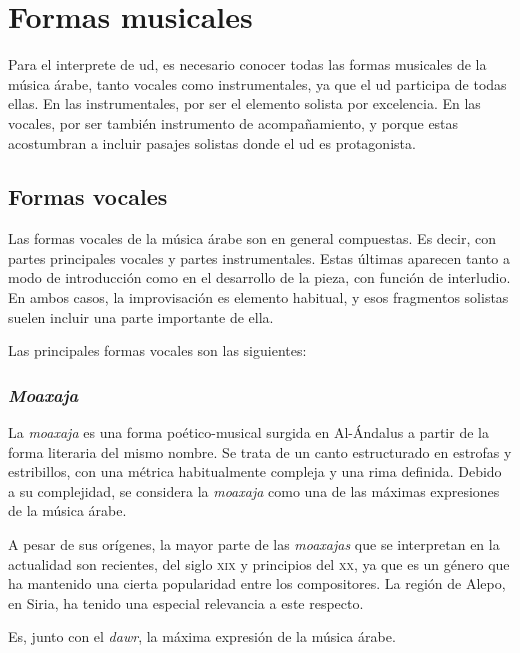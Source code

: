 
\section{Formas musicales}

    Para el interprete de ud, es necesario conocer todas las formas musicales de la música árabe, tanto vocales como instrumentales, ya que el ud participa de todas ellas. En las instrumentales, por ser el elemento solista por excelencia. En las vocales, por ser también instrumento de acompañamiento, y porque estas acostumbran a incluir pasajes solistas donde el ud es protagonista.

\subsection{Formas vocales}

    Las formas vocales de la música árabe son en general compuestas. Es decir, con partes principales vocales y partes instrumentales. Estas últimas aparecen tanto a modo de introducción como en el desarrollo de la pieza, con función de interludio. En ambos casos, la improvisación es elemento habitual, y esos fragmentos solistas suelen incluir una parte importante de ella.

    Las principales formas vocales son las siguientes:

    \subsubsection{\emph{Moaxaja}}

    La \emph{moaxaja} es una forma poético-musical surgida en Al-Ándalus a partir de la forma literaria del mismo nombre. Se trata de un canto estructurado en estrofas y estribillos, con una métrica habitualmente compleja y una rima definida. Debido a su complejidad, se considera la \emph{moaxaja} como una de las máximas expresiones de la música árabe.

    A pesar de sus orígenes, la mayor parte de las \emph{moaxajas} que se interpretan en la actualidad son recientes, del siglo \textsc{xix} y principios del \textsc{xx}, ya que es un género que ha mantenido una cierta popularidad entre los compositores. La región de Alepo, en Siria, ha tenido una especial relevancia a este respecto.

    Es, junto con el \emph{dawr}, la máxima expresión de la música árabe.


